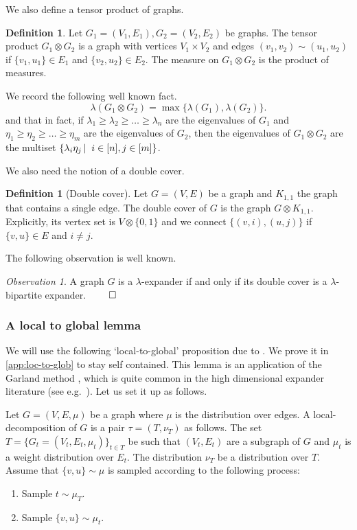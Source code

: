 \documentclass[10pt,a4paper]{article}
\newcommand{\prettyref}[1]{\cref{#1}}
\theoremstyle{definition}
\newtheorem{definition}[theorem]{Definition}
\theoremstyle{remark}
\newtheorem{observation}[theorem]{Observation}
\newcommand\sett[2]{\left\{ #1 \left| \; \vphantom{#1 #2} \right. #2  \right\}}
\newcommand{\set}[1]{\{#1\}}
\renewcommand{\geq}{\geqslant}
\numberwithin{equation}{section}
\let\pref=\prettyref
\def\T{T}
\begin{document}
We also define a tensor product of graphs.
\begin{definition}
    Let \(G_1 = (V_1,E_1),G_2 = (V_2,E_2)\) be graphs. The tensor product \(G_1 \otimes G_2\) is a graph with vertices \(V_1 \times V_2\) and edges \((v_1,v_2) \sim (u_1,u_2)\) if \(\set{v_1,u_1} \in E_1\) and \(\set{v_2,u_2} \in E_2\). The measure on \(G_1\otimes G_2\) is the product of measures.
\end{definition}
We record the following well known fact.
\begin{equation} \label{eq:tensors}
    \lambda(G_1 \otimes G_2) = \max \set{\lambda(G_1), \lambda(G_2)}.
\end{equation}
and that in fact, if \(\lambda_1 \geq \lambda_2 \geq \dots \geq \lambda_n\) are the eigenvalues of \(G_1\) and \(\eta_1 \geq \eta_2 \geq \dots \geq \eta_m\) are the eigenvalues of \(G_2\), then the eigenvalues of \(G_1 \otimes G_2\) are the multiset \(\sett{\lambda_i \eta_j}{i \in [n], j \in [m]}\).

We also need the notion of a double cover.
\begin{definition}[Double cover] \label{def:double-cover}
    Let \(G = (V,E)\) be a graph and \(K_{1,1}\) the graph that contains a single edge. The double cover of \(G\) is the graph \(G \otimes K_{1,1}\). Explicitly, its vertex set is \(V \otimes \set{0,1}\) and we connect \(\set{(v,i),(u,j)}\) if \(\set{v,u} \in E\) and \(i \ne j\).
\end{definition}
The following observation is well known.
\begin{observation} \label{obs:double-cover-expansion}
    A graph \(G\) is a \(\lambda\)-expander if and only if its double cover is a \(\lambda\)-bipartite expander. \(\qed\)
\end{observation}

\subsubsection{A local to global lemma} \label{sec:local-to-global}
We will use the following `local-to-global' proposition due to \cite[Theorem 1.1]{Madras2002}. We prove it in \pref{app:loc-to-glob} to stay self contained. This lemma is an application of the Garland method \cite{Garland1973}, which is quite common in the high dimensional expander literature (see e.g.\ \cite{oppenheim2018local}). Let us set it up as follows.

Let \(G = (V,E,\mu)\) be a graph where \(\mu\) is the distribution over edges. A local-decomposition of \(G\) is a pair \(\tau = (\T,\nu_{\T})\) as follows. The set \(\T = \set{G_t=(V_t,E_t,\mu_t)}_{t \in \T}\) be such that \((V_t,E_t)\) are a subgraph of \(G\) and \(\mu_t\) is a weight distribution over \(E_t\). The distribution \(\nu_\T\) be a distribution over \(\T\). Assume that \(\set{v,u} \sim \mu\) is sampled according to the following process:
\begin{enumerate}
    \item Sample \(t \sim \mu_\T\).
    \item Sample \(\set{v,u} \sim \mu_t\).
\end{enumerate}
\end{document}
